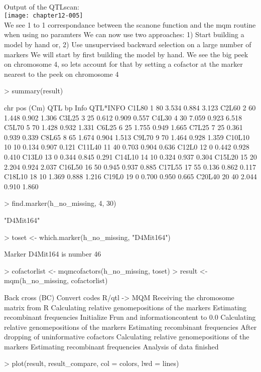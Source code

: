 \documentclass[a4paper]{article}
\begin{document}
\\
Output of the QTLscan:
\\
\texttt{[image: chapter12-005]}
\\
We see 1 to 1 correspondance between the scanone function and the mqm routine when using no paramters
We can now use two approaches:
1) Start building a model by hand or,
2) Use unsupervised backward selection on a large number of markers
We will start by first building the model by hand. We see the big peek on chromosome 4,
so lets account for that by setting a cofactor at the marker nearest to the peek on chromosome 4
\\
\begin{Schunk}
\begin{Sinput}
> summary(result)
\end{Sinput}
\begin{Soutput}
       chr pos (Cm) QTL bp  Info QTL*INFO
C1L80    1       80  3.534 0.884    3.123
C2L60    2       60  1.448 0.902    1.306
C3L25    3       25  0.612 0.909    0.557
C4L30    4       30  7.059 0.923    6.518
C5L70    5       70  1.428 0.932    1.331
C6L25    6       25  1.755 0.949    1.665
C7L25    7       25  0.361 0.939    0.339
C8L65    8       65  1.674 0.904    1.513
C9L70    9       70  1.464 0.928    1.359
C10L10  10       10  0.134 0.907    0.121
C11L40  11       40  0.703 0.904    0.636
C12L0   12        0  0.442 0.928    0.410
C13L0   13        0  0.344 0.845    0.291
C14L10  14       10  0.324 0.937    0.304
C15L20  15       20  2.204 0.924    2.037
C16L50  16       50  0.945 0.937    0.885
C17L55  17       55  0.136 0.862    0.117
C18L10  18       10  1.369 0.888    1.216
C19L0   19        0  0.700 0.950    0.665
C20L40  20       40  2.044 0.910    1.860
\end{Soutput}
\begin{Sinput}
> find.marker(h_no_missing, 4, 30)
\end{Sinput}
\begin{Soutput}
[1] "D4Mit164"
\end{Soutput}
\begin{Sinput}
> toset <- which.marker(h_no_missing, "D4Mit164")
\end{Sinput}
\begin{Soutput}
Marker D4Mit164 is number 46 
\end{Soutput}
\begin{Sinput}
> cofactorlist <- mqmcofactors(h_no_missing, toset)
> result <- mqm(h_no_missing, cofactorlist)
\end{Sinput}
\begin{Soutput}
Back cross (BC)
Convert codes R/qtl -> MQM
Receiving the chromosome matrix from R
Calculating relative genomepositions of the markers
Estimating recombinant frequencies
Initialize Frun and informationcontent to 0.0
Calculating relative genomepositions of the markers
Estimating recombinant frequencies
After dropping of uninformative cofactors
Calculating relative genomepositions of the markers
Estimating recombinant frequencies
Analysis of data finished
\end{Soutput}
\begin{Sinput}
> plot(result, result_compare, col = colors, lwd = lines)
\end{Sinput}
\end{Schunk}
\end{document}
